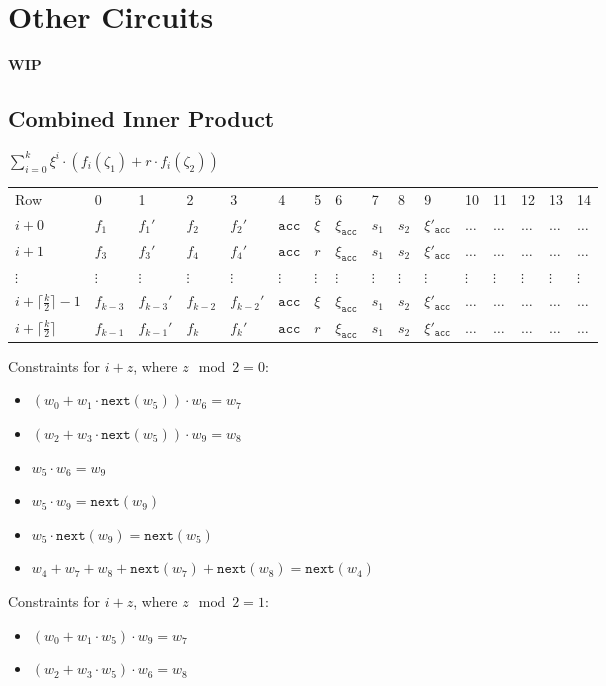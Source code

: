 \section{Other Circuits}
\label{section:other}
\textbf{WIP}

\subsection{Combined Inner Product}

$\sum\limits_{i = 0}^{k} \xi^i \cdot (f_i(\zeta_1) + r \cdot f_i(\zeta_2))$

\begin{center}
\begin{table}[H]
\begin{tabular}{llllllllllllllll}
 Row  & 0 & 1 & 2 & 3 & 4 & 5 & 6 & 7 & 8 & 9 & 10 & 11 & 12 & 13 & 14 \\
 $i + 0$ 	  & $f_1$ & $f_1'$ & $f_2$ & $f_2'$ & $\texttt{acc}$ & $\xi$ & $\xi_{\texttt{acc}}$ & $s_1$ & $s_2$ & $\xi'_{\texttt{acc}}$ & $\dots$ & $\dots$ & $\dots$ & $\dots$ & $\dots$ \\
 $i + 1$ 	  & $f_3$ & $f_3'$ & $f_4$ & $f_4'$ & $\texttt{acc}$ & $r$ & $\xi_{\texttt{acc}}$ & $s_1$ & $s_2$ & $\xi'_{\texttt{acc}}$ & $\dots$ & $\dots$ & $\dots$ & $\dots$ & $\dots$ \\
$\vdots$	& $\vdots$ & $\vdots$ & $\vdots$ & $\vdots$ & $\vdots$ & $\vdots$ & $\vdots$ & $\vdots$ & $\vdots$ & $\vdots$ & $\vdots$ & $\vdots$ & $\vdots$ & $\vdots$ & $\vdots$ \\
 $i + \lceil \frac{k}{2} \rceil - 1$ 	  & $f_{k - 3}$ & $f_{k - 3}'$ & $f_{k - 2}$ & $f_{k - 2}'$ & $\texttt{acc}$ & $\xi$ & $\xi_{\texttt{acc}}$ & $s_1$ & $s_2$ & $\xi'_{\texttt{acc}}$ & $\dots$ & $\dots$ & $\dots$ & $\dots$ & $\dots$ \\
 $i + \lceil \frac{k}{2} \rceil$ 	 & $f_{k - 1}$ & $f_{k - 1}'$ & $f_k$ & $f_k'$ & $\texttt{acc}$ & $r$ & $\xi_{\texttt{acc}}$ & $s_1$ & $s_2$ & $\xi'_{\texttt{acc}}$ & $\dots$ & $\dots$ & $\dots$ & $\dots$ & $\dots$ \\
\end{tabular}
\end{table}
\end{center}

Constraints for $i + z$, where $z\mod 2 = 0$:
\begin{itemize}
	\item $(w_0 + w_1 \cdot \texttt{next}(w_5)) \cdot w_6 = w_7$
	\item $(w_2 + w_3 \cdot \texttt{next}(w_5)) \cdot w_9 = w_8$
	\item $w_5 \cdot w_6 = w_9$
	\item $w_5 \cdot w_9 = \texttt{next}(w_9)$
	\item $w_5 \cdot \texttt{next}(w_9) = \texttt{next}(w_5)$
	\item $w_4 + w_7 + w_8 + \texttt{next}(w_7) + \texttt{next}(w_8) = \texttt{next}(w_4)$
\end{itemize}

Constraints for $i + z$, where $z\mod 2 = 1$:
\begin{itemize}
	\item $(w_0 + w_1 \cdot w_5) \cdot w_9 = w_7$
	\item $(w_2 + w_3 \cdot w_5) \cdot w_6 = w_8$
\end{itemize}